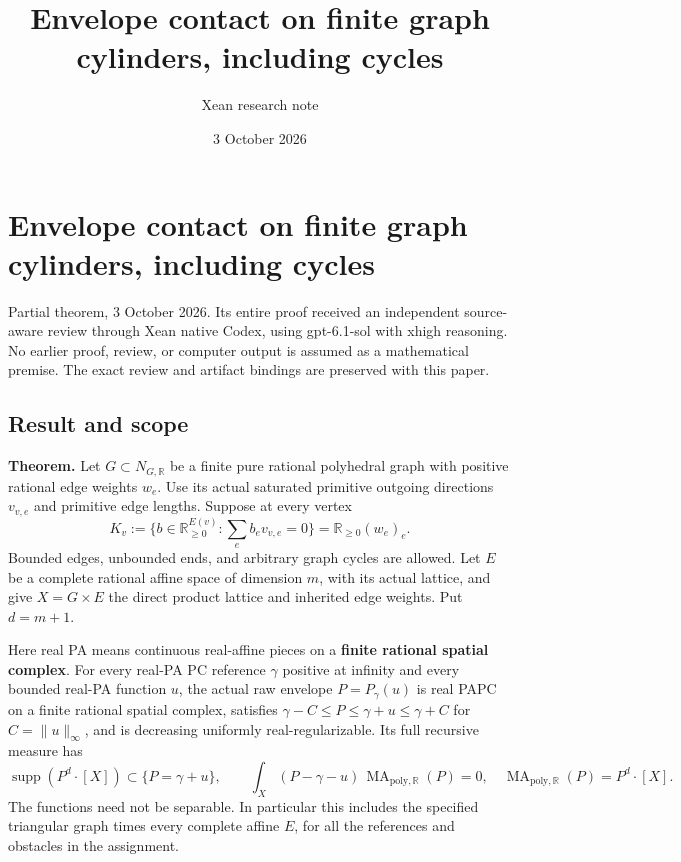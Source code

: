 \documentclass[
  11pt,
]{article}
\title{Envelope contact on finite graph cylinders, including cycles}
\author{Xean research note}
\date{3 October 2026}
\begin{document}
\maketitle

\section{Envelope contact on finite graph cylinders, including
cycles}\label{envelope-contact-on-finite-graph-cylinders-including-cycles}

Partial theorem, 3 October 2026. Its entire proof received an independent
source-aware review through Xean native Codex, using gpt-6.1-sol with
xhigh reasoning. No earlier proof, review, or computer output is assumed
as a mathematical premise. The exact review and artifact bindings are
preserved with this paper.

\subsection{Result and scope}\label{result-and-scope}

\textbf{Theorem.} Let \(G\subset N_{G,\mathbb{R}}\) be a finite pure
rational polyhedral graph with positive rational edge weights \(w_e\).
Use its actual saturated primitive outgoing directions \(v_{v,e}\) and
primitive edge lengths. Suppose at every vertex \[
 K_v:=\{b\in\mathbb{R}_{\geq0}^{E(v)}:\sum_e b_ev_{v,e}=0\}
       =\mathbb{R}_{\geq0}(w_e)_e.                 \tag{1}
\] Bounded edges, unbounded ends, and arbitrary graph cycles are
allowed. Let \(E\) be a complete rational affine space of dimension
\(m\), with its actual lattice, and give \(X=G\times E\) the direct
product lattice and inherited edge weights. Put \(d=m+1\).

Here real PA means continuous real-affine pieces on a \textbf{finite
rational spatial complex}. For every real-PA PC reference \(\gamma\)
positive at infinity and every bounded real-PA function \(u\), the
actual raw envelope \(P=P_\gamma(u)\) is real PAPC on a finite rational
spatial complex, satisfies \(\gamma-C\leq P\leq\gamma+u\leq\gamma+C\)
for \(C=\|u\|_\infty\), and is decreasing uniformly real-regularizable.
Its full recursive measure has \[
 \operatorname{supp}(P^d\cdot[X])\subset\{P=\gamma+u\},\qquad
 \int_X(P-\gamma-u)\,\operatorname{MA}_{\mathrm{poly},\mathbb{R}}(P)=0,
 \quad \operatorname{MA}_{\mathrm{poly},\mathbb{R}}(P)=P^d\cdot[X]. \tag{2}
\] The functions need not be separable. In particular this includes the
specified triangular graph times every complete affine \(E\), for all
the references and obstacles in the assignment.
\end{document}
